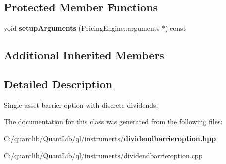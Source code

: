 \subsection*{Protected Member Functions}
\begin{DoxyCompactItemize}
\item 
void {\bfseries setup\+Arguments} (Pricing\+Engine\+::arguments $\ast$) const \label{class_quant_lib_1_1_dividend_barrier_option_aae9f33cd6493ab07281751b41adeec13}

\end{DoxyCompactItemize}
\subsection*{Additional Inherited Members}


\subsection{Detailed Description}
Single-\/asset barrier option with discrete dividends. 



The documentation for this class was generated from the following files\+:\begin{DoxyCompactItemize}
\item 
C\+:/quantlib/\+Quant\+Lib/ql/instruments/{\bf dividendbarrieroption.\+hpp}\item 
C\+:/quantlib/\+Quant\+Lib/ql/instruments/dividendbarrieroption.\+cpp\end{DoxyCompactItemize}

